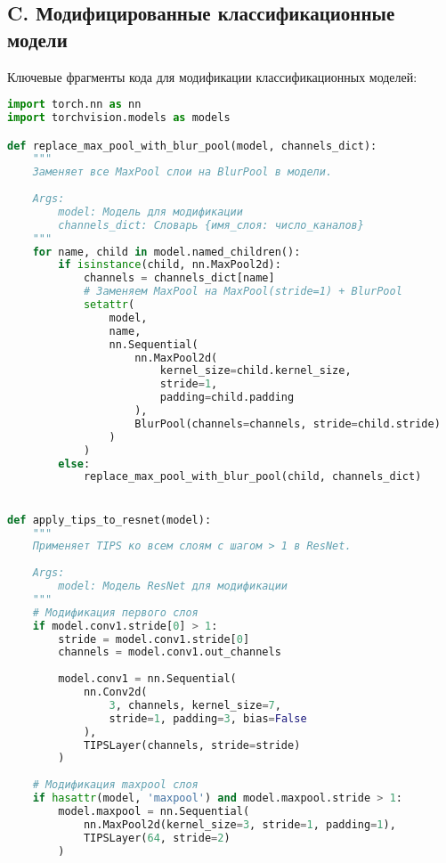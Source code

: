 \subsection*{C. Модифицированные классификационные модели}
\label{appendix:classifiers_code}

Ключевые фрагменты кода для модификации классификационных моделей:

\begin{lstlisting}[language=Python]
import torch.nn as nn
import torchvision.models as models

def replace_max_pool_with_blur_pool(model, channels_dict):
    """
    Заменяет все MaxPool слои на BlurPool в модели.
    
    Args:
        model: Модель для модификации
        channels_dict: Словарь {имя_слоя: число_каналов}
    """
    for name, child in model.named_children():
        if isinstance(child, nn.MaxPool2d):
            channels = channels_dict[name]
            # Заменяем MaxPool на MaxPool(stride=1) + BlurPool
            setattr(
                model, 
                name, 
                nn.Sequential(
                    nn.MaxPool2d(
                        kernel_size=child.kernel_size,
                        stride=1,
                        padding=child.padding
                    ),
                    BlurPool(channels=channels, stride=child.stride)
                )
            )
        else:
            replace_max_pool_with_blur_pool(child, channels_dict)


def apply_tips_to_resnet(model):
    """
    Применяет TIPS ко всем слоям с шагом > 1 в ResNet.
    
    Args:
        model: Модель ResNet для модификации
    """
    # Модификация первого слоя
    if model.conv1.stride[0] > 1:
        stride = model.conv1.stride[0]
        channels = model.conv1.out_channels
        
        model.conv1 = nn.Sequential(
            nn.Conv2d(
                3, channels, kernel_size=7, 
                stride=1, padding=3, bias=False
            ),
            TIPSLayer(channels, stride=stride)
        )
    
    # Модификация maxpool слоя
    if hasattr(model, 'maxpool') and model.maxpool.stride > 1:
        model.maxpool = nn.Sequential(
            nn.MaxPool2d(kernel_size=3, stride=1, padding=1),
            TIPSLayer(64, stride=2)
        )
\end{lstlisting}

